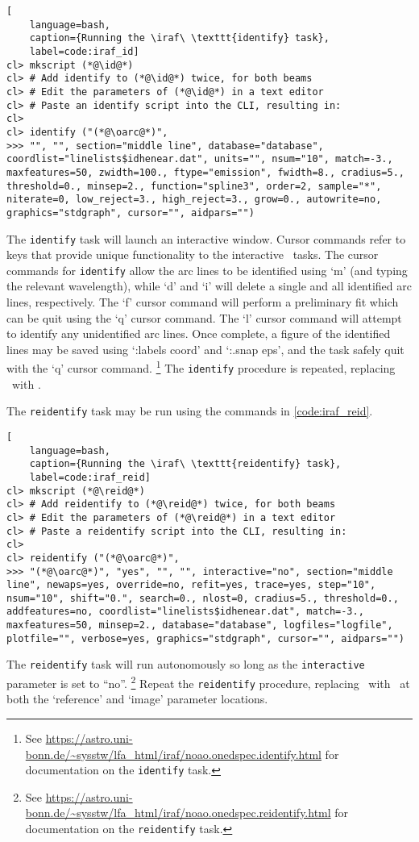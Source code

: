 \begin{lstlisting}[
    language=bash,
    caption={Running the \iraf\ \texttt{identify} task},
    label=code:iraf_id]
cl> mkscript (*@\id@*)
cl> # Add identify to (*@\id@*) twice, for both beams
cl> # Edit the parameters of (*@\id@*) in a text editor
cl> # Paste an identify script into the CLI, resulting in:
cl> 
cl> identify ("(*@\oarc@*)",
>>> "", "", section="middle line", database="database", coordlist="linelists$idhenear.dat", units="", nsum="10", match=-3., maxfeatures=50, zwidth=100., ftype="emission", fwidth=8., cradius=5., threshold=0., minsep=2., function="spline3", order=2, sample="*", niterate=0, low_reject=3., high_reject=3., grow=0., autowrite=no, graphics="stdgraph", cursor="", aidpars="")
\end{lstlisting}
{\parskip=0pt The} \texttt{identify} task will launch an interactive window. Cursor commands refer to keys that provide unique functionality to the interactive \iraf\ tasks. The cursor commands for \texttt{identify} allow the arc lines to be identified using `m' (and typing the relevant wavelength), while `d' and `i' will delete a single and all identified arc lines, respectively. The `f' cursor command will perform a preliminary fit which can be quit using the `q' cursor command. The `l' cursor command will attempt to identify any unidentified arc lines. Once complete, a figure of the identified lines may be saved using `:labels coord' and `:.snap eps', and the task safely quit with the `q' cursor command.%
\footnote{See \protect\url{https://astro.uni-bonn.de/~sysstw/lfa_html/iraf/noao.onedspec.identify.html} for documentation on the \texttt{identify} task.}
The \texttt{identify} procedure is repeated, replacing \oarc\ with \earc.

The \texttt{reidentify} task may be run using the commands in \autoref{code:iraf_reid}.

\begin{lstlisting}[
    language=bash,
    caption={Running the \iraf\ \texttt{reidentify} task},
    label=code:iraf_reid]
cl> mkscript (*@\reid@*)
cl> # Add reidentify to (*@\reid@*) twice, for both beams
cl> # Edit the parameters of (*@\reid@*) in a text editor
cl> # Paste a reidentify script into the CLI, resulting in:
cl> 
cl> reidentify ("(*@\oarc@*)",
>>> "(*@\oarc@*)", "yes", "", "", interactive="no", section="middle line", newaps=yes, override=no, refit=yes, trace=yes, step="10", nsum="10", shift="0.", search=0., nlost=0, cradius=5., threshold=0., addfeatures=no, coordlist="linelists$idhenear.dat", match=-3., maxfeatures=50, minsep=2., database="database", logfiles="logfile", plotfile="", verbose=yes, graphics="stdgraph", cursor="", aidpars="")
\end{lstlisting}
{\parskip=0pt The} \texttt{reidentify} task will run autonomously so long as the \texttt{interactive} parameter is set to ``no''.%
\footnote{See \protect\url{https://astro.uni-bonn.de/~sysstw/lfa_html/iraf/noao.onedspec.reidentify.html} for documentation on the \texttt{reidentify} task.}
Repeat the \texttt{reidentify} procedure, replacing \oarc\ with \earc\ at both the `reference' and `image' parameter locations.

